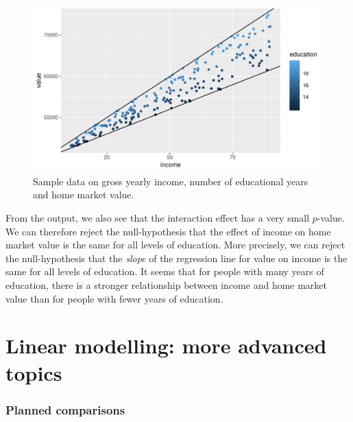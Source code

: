 \documentclass[]{report}\usepackage[]{graphicx}\usepackage[]{color}
\makeatletter
\def\maxwidth{ %
  \ifdim\Gin@nat@width>\linewidth
    \linewidth
  \else
    \Gin@nat@width
  \fi
}
\makeatother
\begin{document}
\begin{figure}

{\centering \includegraphics[width=\maxwidth]{figure/linearbylinear_2-1} 

}

\caption[Sample data on gross yearly income, number of educational years and home market value]{Sample data on gross yearly income, number of educational years and home market value.}\label{fig:linearbylinear_2}
\end{figure}



From the output, we also see that the interaction effect has a very small $p$-value. We can therefore reject the null-hypothesis that the effect of income on home market value is the same for all levels of education. More precisely, we can reject the null-hypothesis that the \textit{slope} of the regression line for value on income is the same for all levels of education. It seems that for people with many years of education, there is a stronger relationship between income and home market value than for people with fewer years of education. 



\chapter{Linear modelling: more advanced topics}\label{chap:advanced}


\subsection{Planned comparisons}
\end{document}
